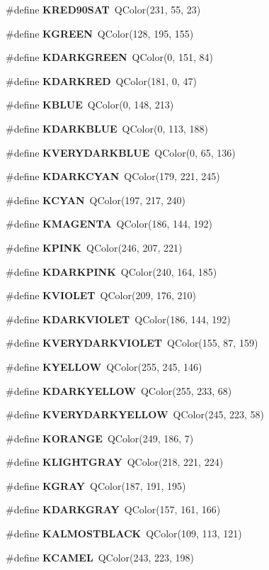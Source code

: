 \begin{DoxyCompactItemize}
\#define {\bf K\+R\+E\+D90\+S\+AT}~Q\+Color(231, 55, 23)
\item 
\#define {\bf K\+G\+R\+E\+EN}~Q\+Color(128, 195, 155)
\item 
\#define {\bf K\+D\+A\+R\+K\+G\+R\+E\+EN}~Q\+Color(0, 151, 84)
\item 
\#define {\bf K\+D\+A\+R\+K\+R\+ED}~Q\+Color(181, 0, 47)
\item 
\#define {\bf K\+B\+L\+UE}~Q\+Color(0, 148, 213)
\item 
\#define {\bf K\+D\+A\+R\+K\+B\+L\+UE}~Q\+Color(0, 113, 188)
\item 
\#define {\bf K\+V\+E\+R\+Y\+D\+A\+R\+K\+B\+L\+UE}~Q\+Color(0, 65, 136)
\item 
\#define {\bf K\+D\+A\+R\+K\+C\+Y\+AN}~Q\+Color(179, 221, 245)
\item 
\#define {\bf K\+C\+Y\+AN}~Q\+Color(197, 217, 240)
\item 
\#define {\bf K\+M\+A\+G\+E\+N\+TA}~Q\+Color(186, 144, 192)
\item 
\#define {\bf K\+P\+I\+NK}~Q\+Color(246, 207, 221)
\item 
\#define {\bf K\+D\+A\+R\+K\+P\+I\+NK}~Q\+Color(240, 164, 185)
\item 
\#define {\bf K\+V\+I\+O\+L\+ET}~Q\+Color(209, 176, 210)
\item 
\#define {\bf K\+D\+A\+R\+K\+V\+I\+O\+L\+ET}~Q\+Color(186, 144, 192)
\item 
\#define {\bf K\+V\+E\+R\+Y\+D\+A\+R\+K\+V\+I\+O\+L\+ET}~Q\+Color(155, 87, 159)
\item 
\#define {\bf K\+Y\+E\+L\+L\+OW}~Q\+Color(255, 245, 146)
\item 
\#define {\bf K\+D\+A\+R\+K\+Y\+E\+L\+L\+OW}~Q\+Color(255, 233, 68)
\item 
\#define {\bf K\+V\+E\+R\+Y\+D\+A\+R\+K\+Y\+E\+L\+L\+OW}~Q\+Color(245, 223, 58)
\item 
\#define {\bf K\+O\+R\+A\+N\+GE}~Q\+Color(249, 186, 7)
\item 
\#define {\bf K\+L\+I\+G\+H\+T\+G\+R\+AY}~Q\+Color(218, 221, 224)
\item 
\#define {\bf K\+G\+R\+AY}~Q\+Color(187, 191, 195)
\item 
\#define {\bf K\+D\+A\+R\+K\+G\+R\+AY}~Q\+Color(157, 161, 166)
\item 
\#define {\bf K\+A\+L\+M\+O\+S\+T\+B\+L\+A\+CK}~Q\+Color(109, 113, 121)
\item 
\#define {\bf K\+C\+A\+M\+EL}~Q\+Color(243, 223, 198)
\item 

\end{DoxyCompactItemize}
